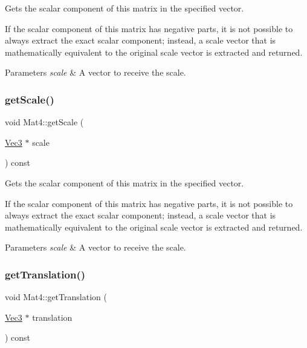 Gets the scalar component of this matrix in the specified vector.

If the scalar component of this matrix has negative parts, it is not possible to always extract the exact scalar component; instead, a scale vector that is mathematically equivalent to the original scale vector is extracted and returned.


\begin{DoxyParams}{Parameters}
{\em scale} & A vector to receive the scale. \\
\hline
\end{DoxyParams}
\mbox{\label{classMat4_a6e71ae3f0286e5ea417f237aa0cdefeb}} 
\subsubsection{\texorpdfstring{get\+Scale()}{getScale()}\hspace{0.1cm}{\footnotesize\ttfamily [2/2]}}
{\footnotesize\ttfamily void Mat4\+::get\+Scale (\begin{DoxyParamCaption}\item[{\hyperlink{classVec3}{Vec3} $\ast$}]{scale }\end{DoxyParamCaption}) const}

Gets the scalar component of this matrix in the specified vector.

If the scalar component of this matrix has negative parts, it is not possible to always extract the exact scalar component; instead, a scale vector that is mathematically equivalent to the original scale vector is extracted and returned.


\begin{DoxyParams}{Parameters}
{\em scale} & A vector to receive the scale. \\
\hline
\end{DoxyParams}
\mbox{\label{classMat4_a92b33d42c6766de2183ebd53269fb96c}} 
\subsubsection{\texorpdfstring{get\+Translation()}{getTranslation()}\hspace{0.1cm}{\footnotesize\ttfamily [1/2]}}
{\footnotesize\ttfamily void Mat4\+::get\+Translation (\begin{DoxyParamCaption}\item[{\hyperlink{classVec3}{Vec3} $\ast$}]{translation }\end{DoxyParamCaption}) const}

